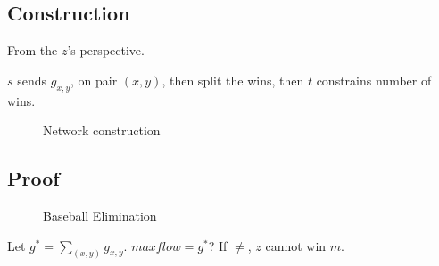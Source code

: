 \documentclass[a4paper]{report}
\theoremstyle{definition}
\begin{document}
\subsection{Construction}
From the $z$'s perspective.

$s$ sends $g_{x,y}$, on pair $(x,y)$, then split the wins, then $t$ constrains number of wins.

\begin{figure}[!htp]
\centering
{}
\caption{Network construction}
\label{fig:baseball01}
\end{figure}

\subsection{Proof}
\begin{figure}[!htp]
\centering
{}
\caption{Baseball Elimination}
\label{fig:baseball}
\end{figure}
Let $g^*=\sum_{(x,y)} g_{x, y}$. $maxflow = g^*$? If $\neq$, $z$ cannot win $m$.
\end{document}
